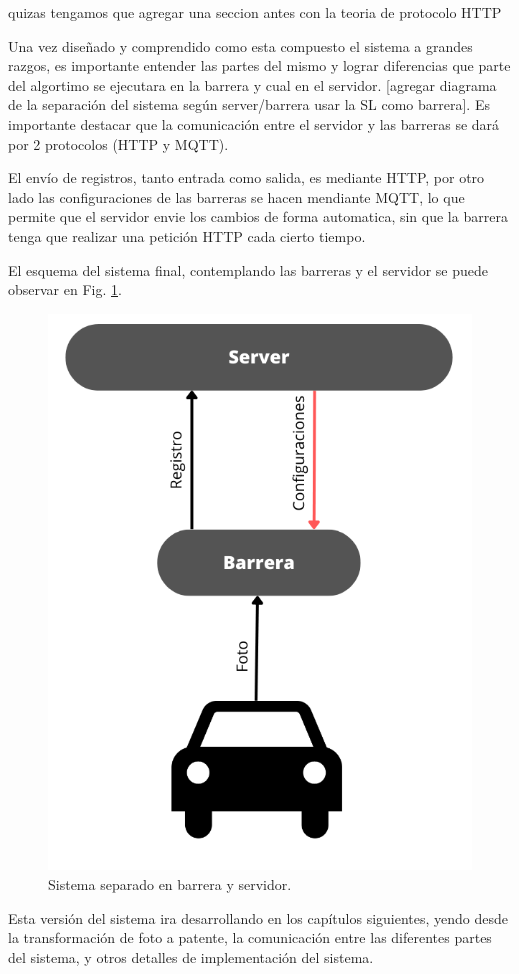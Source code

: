  {\huge quizas tengamos que agregar una seccion antes con la teoria de protocolo HTTP}

Una vez diseñado y comprendido como esta compuesto el sistema a grandes razgos, es importante entender las partes del mismo y lograr diferencias que parte del algortimo se ejecutara en la barrera y cual en el servidor. [agregar diagrama de la separación del sistema según server/barrera usar la SL como barrera]. Es importante destacar que la comunicación entre el servidor y las barreras se dará por 2 protocolos (HTTP y MQTT).

El envío de registros, tanto entrada como salida, es mediante HTTP, por otro lado las configuraciones de las barreras se hacen mendiante MQTT, lo que permite que el servidor envie los cambios de forma automatica, sin que la barrera tenga que realizar una petición HTTP cada cierto tiempo.

El esquema del sistema final, contemplando las barreras y el servidor se puede observar en Fig. \ref{fig:sistema-server-barrera}.

\begin{figure}[h]
    \centering
    \includegraphics[width=.4\textwidth]{imgs/sistema-server-barrera}
    \caption{Sistema separado en barrera y servidor.}
    \label{fig:sistema-server-barrera}
\end{figure}

Esta versión del sistema ira desarrollando en los capítulos siguientes, yendo desde la transformación de foto a patente, la comunicación entre las diferentes partes del sistema, y otros detalles de implementación del sistema.